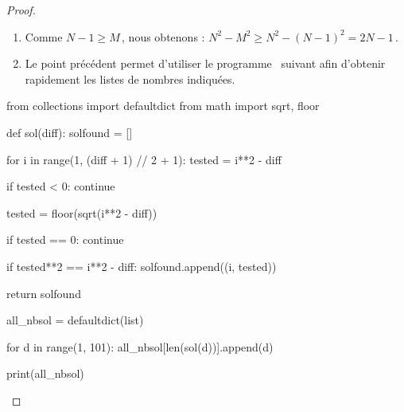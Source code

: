 \begin{proof}
	\leavevmode
	
	\vspace{-1ex}
	\begin{enumerate}
		\item Comme $N - 1 \geq M$\,, nous obtenons :
		$N^2 - M^2 \geq N^2 - (N - 1)^2 = 2N - 1$\,.

		\item Le point précédent permet d'utiliser le programme \python\ suivant afin d'obtenir rapidement les listes de nombres indiquées.
	\end{enumerate}

\bgroup
\small
\begin{Python}
from collections import defaultdict
from math        import sqrt, floor

def sol(diff):
    solfound = []

    for i in range(1, (diff + 1) // 2 + 1):
        tested = i**2 - diff

        if tested < 0:
            continue

        tested = floor(sqrt(i**2 - diff))

        if tested == 0:
            continue

        if tested**2 == i**2 - diff:
            solfound.append((i, tested))

    return solfound

all_nbsol = defaultdict(list)

for d in range(1, 101):
    all_nbsol[len(sol(d))].append(d)

print(all_nbsol)
\end{Python}
\egroup	


		\qedhere
\end{proof}

	
%
%
%
%
%
%
%
